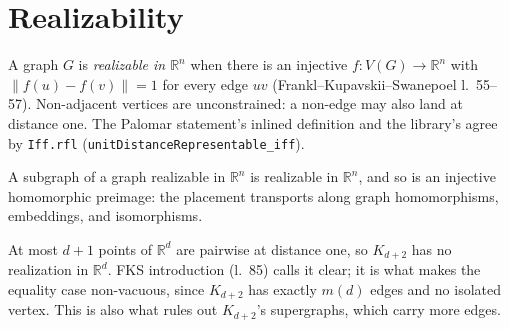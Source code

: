 \section{Realizability}

\begin{definition}
  \label{def:representable}
  \leanok
  A graph $G$ is \emph{realizable in $\mathbb{R}^n$} when there is an injective
  $f : V(G) \to \mathbb{R}^n$ with $\lVert f(u) - f(v)\rVert = 1$ for every edge $uv$
  (Frankl--Kupavskii--Swanepoel l.~55--57). Non-adjacent vertices are unconstrained: a
  non-edge may also land at distance one. The Palomar statement's inlined definition and
  the library's agree by \texttt{Iff.rfl} (\texttt{unitDistanceRepresentable\_iff}).
\end{definition}

\begin{lemma}[Monotonicity]
  \label{lem:monotone}
  \leanok
  A subgraph of a graph realizable in $\mathbb{R}^n$ is realizable in $\mathbb{R}^n$, and so
  is an injective homomorphic preimage: the placement transports along graph homomorphisms,
  embeddings, and isomorphisms.
\end{lemma}

\begin{lemma}
  \label{lem:complete-lower}
  \leanok
  At most $d + 1$ points of $\mathbb{R}^d$ are pairwise at distance one, so $K_{d+2}$ has no
  realization in $\mathbb{R}^d$. FKS introduction (l.~85) calls it clear; it is what makes
  the equality case non-vacuous, since $K_{d+2}$ has exactly $m(d)$ edges and no isolated
  vertex. This is also what rules out $K_{d+2}$'s supergraphs, which carry more edges.
\end{lemma}


